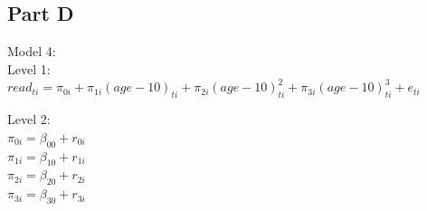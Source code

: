 \documentclass[]{article}
\newenvironment{Shaded}{\begin{snugshade}}{\end{snugshade}}
\newcommand{\KeywordTok}[1]{\textcolor[rgb]{0.13,0.29,0.53}{\textbf{#1}}}
\newcommand{\DataTypeTok}[1]{\textcolor[rgb]{0.13,0.29,0.53}{#1}}
\newcommand{\DecValTok}[1]{\textcolor[rgb]{0.00,0.00,0.81}{#1}}
\newcommand{\StringTok}[1]{\textcolor[rgb]{0.31,0.60,0.02}{#1}}
\newcommand{\OperatorTok}[1]{\textcolor[rgb]{0.81,0.36,0.00}{\textbf{#1}}}
\newcommand{\NormalTok}[1]{#1}
\begin{document}
\subsection{Part D}\label{part-d}

Model 4:\\
Level 1:\\
\(read_{ti} = \pi_{0i} + \pi_{1i}(age-10)_{ti} + \pi_{2i}(age-10)^2_{ti} + \pi_{3i}(age-10)^3_{ti} + e_{ti}\)

Level 2:\\
\(\pi_{0i} = \beta_{00} + r_{0i}\)\\
\(\pi_{1i} = \beta_{10} + r_{1i}\)\\
\(\pi_{2i} = \beta_{20} + r_{2i}\)\\
\(\pi_{3i} = \beta_{30} + r_{3i}\)

\begin{Shaded}
\end{Shaded}
\end{document}
